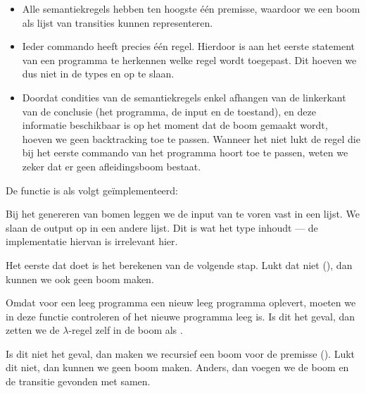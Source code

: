 \begin{itemize}
	\item Alle semantiekregels hebben ten hoogste één premisse, waardoor we een
		boom als lijst van transities kunnen representeren.
	\item Ieder commando heeft precies één regel. Hierdoor is aan het eerste
		statement van een programma te herkennen welke regel wordt toegepast. Dit
		hoeven we dus niet in de types  en  op te
		slaan.
	\item Doordat condities van de semantiekregels enkel afhangen van de
		linkerkant van de conclusie (het programma, de input en de toestand), en
		deze informatie beschikbaar is op het moment dat de boom gemaakt wordt,
		hoeven we geen backtracking toe te passen. Wanneer het niet lukt de regel
		die bij het eerste commando van het programma hoort toe te passen, weten we
		zeker dat er geen afleidingsboom bestaat.
\end{itemize}

De functie  is als volgt geïmplementeerd:



Bij het genereren van bomen leggen we de input van te voren vast in een lijst.
We slaan de output op in een andere lijst. Dit is wat het type 
inhoudt --- de implementatie hiervan is irrelevant hier.

Het eerste dat  doet is het berekenen van de volgende stap. Lukt dat
niet (), dan kunnen we ook geen boom maken.

Omdat  voor een leeg programma een nieuw leeg programma oplevert,
moeten we in deze functie controleren of het nieuwe programma leeg is. Is dit
het geval, dan zetten we de $\lambda$-regel zelf in de boom als .

Is dit niet het geval, dan maken we recursief een boom voor de premisse
(). Lukt dit niet, dan kunnen we geen boom maken.
Anders, dan voegen we de boom en de transitie gevonden met  samen.
